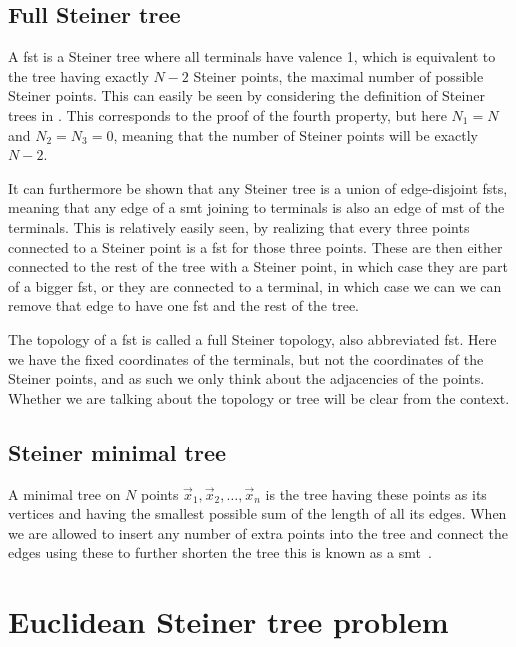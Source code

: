 \subsection{Full Steiner tree}
\label{sec:full-steiner-tree}

A \gls{fst} is a Steiner tree where all terminals have valence 1, which is
equivalent to the tree having exactly $N-2$ Steiner points, the maximal number
of possible Steiner points.  This can easily be seen by considering the
definition of Steiner trees in .  This corresponds to the
proof of the fourth property, but here $N_1 = N$ and $N_2 = N_3 = 0$, meaning
that the number of Steiner points will be exactly $N-2$.

It can furthermore be shown that any Steiner tree is a union of edge-disjoint
\glspl{fst}, meaning that any edge of a \gls{smt} joining to terminals is
also an edge of \gls{mst} of the terminals.  This is relatively easily seen,
by realizing that every three points connected to a Steiner point is a \gls{fst}
for those three points.  These are then either connected to the rest of the tree
with a Steiner point, in which case they are part of a bigger \gls{fst}, or they
are connected to a terminal, in which case we can we can remove that edge
to have one \gls{fst} and the rest of the tree.

The topology of a \gls{fst} is called a full Steiner topology, also abbreviated
\gls{fst}.  Here we have the fixed coordinates of the terminals, but not the
coordinates of the Steiner points, and as such we only think about the
adjacencies of the points.  Whether we are talking about the topology or tree
will be clear from the context.

\subsection{Steiner minimal tree}
\label{sec:steiner-minimal-tree}

A minimal tree on $N$ points $\vec{x}_{1},\vec{x}_{2},\ldots,\vec{x}_{n}$ is the
tree having these points as its vertices and having the smallest possible sum of
the length of all its edges.  When we are allowed to insert any number of extra
points into the tree and connect the edges using these to further shorten the
tree this is known as a \gls{smt}~\cite{Gilbert1968}.


\section{Euclidean Steiner tree problem}
\label{sec:eucl-stein-tree}

